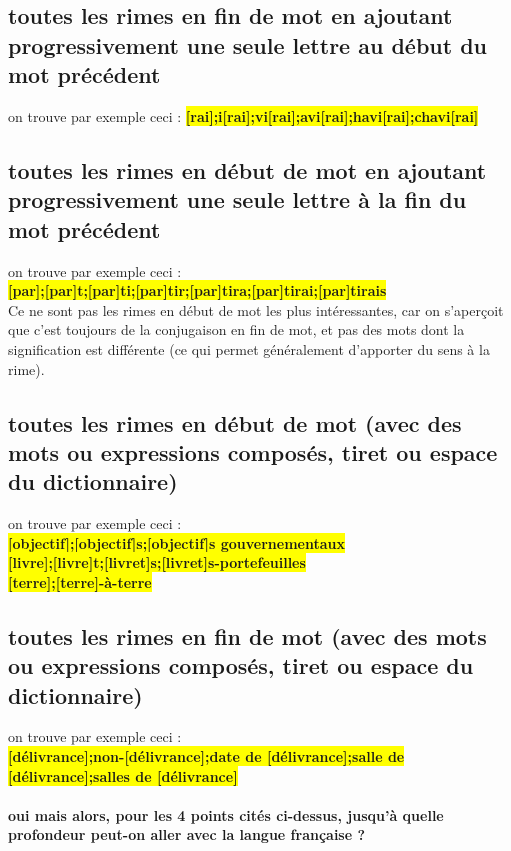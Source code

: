 \documentclass[french]{article}
\begin{document}
\subsection{toutes les rimes en fin de mot en ajoutant progressivement une seule lettre au début du mot précédent}
on trouve par exemple ceci :
\colorbox{yellow}{\textbf{[rai];i[rai];vi[rai];avi[rai];havi[rai];chavi[rai]}}
\subsection{toutes les rimes en début de mot en ajoutant progressivement une seule lettre à la fin du mot précédent}
on trouve par exemple ceci :\\
\colorbox{yellow}{\textbf{[par];[par]t;[par]ti;[par]tir;[par]tira;[par]tirai;[par]tirais}}
\\
Ce ne sont pas les rimes en début de mot les plus intéressantes, car on s'aperçoit que c'est toujours de la conjugaison en fin de mot, et pas des mots dont la signification est différente (ce qui permet généralement d'apporter du sens à la rime).\\
\subsection{toutes les rimes en début de mot (avec des mots ou expressions composés, tiret ou espace du dictionnaire)}
on trouve par exemple ceci :\\
\colorbox{yellow}{\textbf{[objectif];[objectif]s;[objectif]s gouvernementaux}}\\
\colorbox{yellow}{\textbf{[livre];[livre]t;[livret]s;[livret]s-portefeuilles}}\\
\colorbox{yellow}{\textbf{[terre];[terre]-à-terre}}
\subsection{toutes les rimes en fin de mot (avec des mots ou expressions composés, tiret ou espace du dictionnaire)}
on trouve par exemple ceci :\\
\colorbox{yellow}{\textbf{[délivrance];non-[délivrance];date de [délivrance];salle de [délivrance];salles de [délivrance]}}\\
\paragraph{oui mais alors, pour les 4 points cités ci-dessus, jusqu'à quelle profondeur peut-on aller avec la langue française ?}
\end{document}
